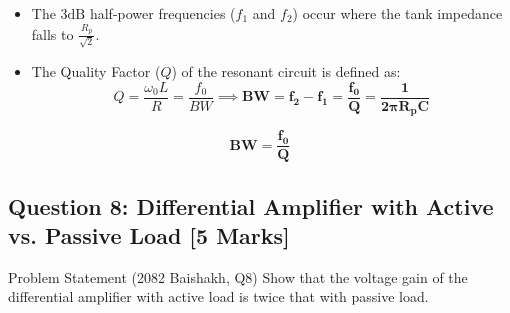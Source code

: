\documentclass[11pt,a4paper,oneside]{book}
\begin{document}
\begin{itemize}[leftmargin=1.5em]
  \item The $3\text{dB}$ half-power frequencies ($f_1$ and $f_2$) occur where the tank impedance falls to $\frac{R_p}{\sqrt{2}}$.
  \item The Quality Factor ($Q$) of the resonant circuit is defined as:
  \[
  Q = \frac{\omega_0 L}{R} = \frac{f_0}{BW} \implies \mathbf{BW = f_2 - f_1 = \frac{f_0}{Q} = \frac{1}{2\pi R_p C}}
  \]
\end{itemize}

\begin{answerbox}
$$\mathbf{BW = \frac{f_0}{Q}}$$
\end{answerbox}

\vspace{0.6cm}

\subsection{Question 8: Differential Amplifier with Active vs. Passive Load [5 Marks]}
\begin{questionbox}{Problem Statement (2082 Baishakh, Q8)}
Show that the voltage gain of the differential amplifier with active load is twice that with passive load.
\end{questionbox}
\end{document}
